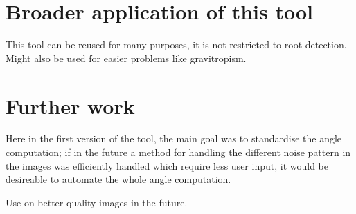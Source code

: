
\section{Broader application of this tool}

This tool can be reused for many purposes, it is not restricted to root detection.
Might also be used for easier problems like gravitropism.

\section{Further work}

Here in the first version of the tool, the main goal was to standardise the angle computation; if in the future  a method for handling the different noise pattern in the images was efficiently handled which require less user input, it would be desireable to automate the whole angle computation.

Use on better-quality images in the future.





